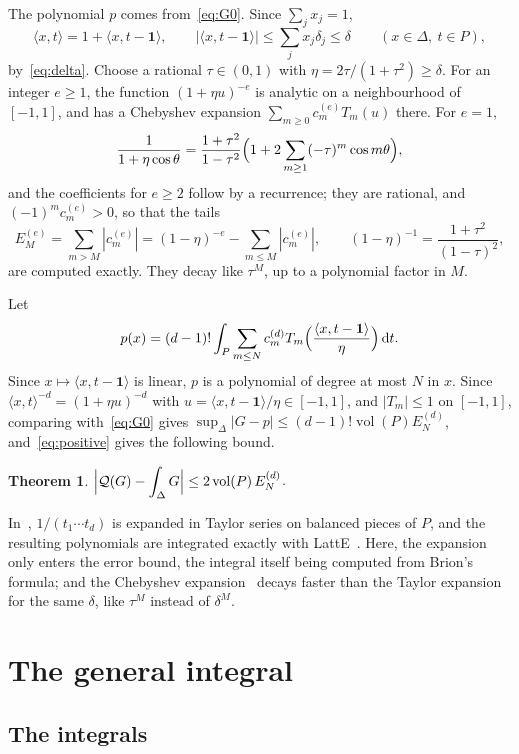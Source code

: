 \documentclass[11pt]{article}
\newtheorem{theorem}{Theorem}[section]
\theoremstyle{remark}
\newcommand{\scal}[2]{\langle #1, #2\rangle}
\newcommand{\vol}{\operatorname{vol}}
\newcommand{\one}{\mathbf{1}}
\newcommand{\dd}{\mathrm{d}}
\begin{document}
The polynomial $p$ comes from~\eqref{eq:G0}. Since $\sum_j x_j = 1$,
\[
  \scal{x}{t} = 1 + \scal{x}{t - \one}, \qquad |\scal{x}{t - \one}| \leq
  \sum_j x_j \delta_j \leq \delta \qquad (x \in \Delta, \ t \in P),
\]
by~\eqref{eq:delta}. Choose a rational $\tau \in (0, 1)$ with $\eta =
2\tau/(1 + \tau^2) \geq \delta$. For an integer $e \geq 1$, the function $(1
+ \eta u)^{-e}$ is analytic on a neighbourhood of $[-1, 1]$, and has a
Chebyshev expansion $\sum_{m \geq 0} c^{(e)}_m T_m(u)$ there. For $e = 1$,
\[
  \frac{1}{1 + \eta\cos\theta} = \frac{1 + \tau^2}{1 - \tau^2} \Bigl( 1 + 2
  \sum_{m \geq 1} (-\tau)^m \cos m\theta \Bigr),
\]
and the coefficients for $e \geq 2$ follow by a recurrence; they are
rational, and $(-1)^m c^{(e)}_m > 0$, so that the tails
\[
  E^{(e)}_M = \sum_{m > M} |c^{(e)}_m| = (1 - \eta)^{-e} - \sum_{m \leq M}
  |c^{(e)}_m|, \qquad (1 - \eta)^{-1} = \frac{1 + \tau^2}{(1 - \tau)^2},
\]
are computed exactly. They decay like $\tau^M$, up to a polynomial factor
in $M$.

Let
\[
  p(x) = (d-1)! \int_P \sum_{m \leq N} c^{(d)}_m T_m\Bigl(
  \frac{\scal{x}{t - \one}}{\eta} \Bigr) \, \dd t.
\]
Since $x \mapsto \scal{x}{t - \one}$ is linear, $p$ is a polynomial of
degree at most $N$ in $x$. Since $\scal{x}{t}^{-d} = (1 + \eta u)^{-d}$ with
$u = \scal{x}{t - \one}/\eta \in [-1, 1]$, and $|T_m| \leq 1$ on $[-1, 1]$,
comparing with~\eqref{eq:G0} gives $\sup_\Delta |G - p| \leq (d-1)! \vol(P)
E^{(d)}_N$, and~\eqref{eq:positive} gives the following bound.

\begin{theorem}\label{thm:bound0}
$\displaystyle \Bigl| \mathcal{Q}(G) - \int_\Delta G \Bigr|
  \leq 2 \vol(P) \, E^{(d)}_N$.
\end{theorem}

In~\cite{DM}, $1/(t_1 \cdots t_d)$ is expanded in Taylor series on balanced
pieces of $P$, and the resulting polynomials are integrated exactly with
LattE~\cite{BaldoniEtAl,DeLoeraEtAl}. Here, the expansion only enters the
error bound, the integral itself being computed from Brion's formula; and
the Chebyshev expansion~\cite{Trefethen} decays faster than the Taylor
expansion for the same $\delta$, like $\tau^M$ instead of $\delta^M$.

\section{The general integral}
\label{sec:general}

\subsection{The integrals}
\end{document}
